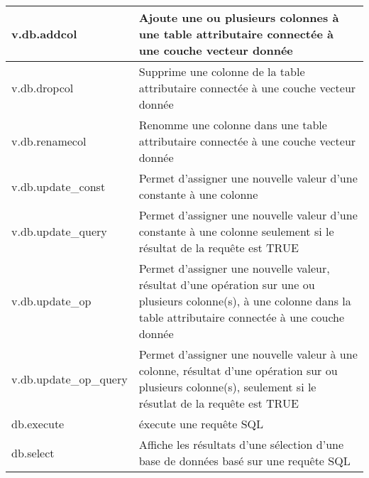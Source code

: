 \begin{table}[H]
\begin{tabular}{|p{4cm}|p{10cm}|}
  \hline v.db.addcol & Ajoute une ou plusieurs colonnes à une table attributaire connectée à une couche vecteur donnée\\
  \hline v.db.dropcol & Supprime une colonne de la table attributaire connectée à une couche vecteur donnée\\
  \hline v.db.renamecol & Renomme une colonne dans une table attributaire connectée à une couche vecteur donnée\\
  \hline v.db.update\_const & Permet d'assigner une nouvelle valeur d'une constante à une colonne\\
  \hline v.db.update\_query & Permet d'assigner une nouvelle valeur d'une constante à une colonne seulement si le résultat de la requ\^ete est TRUE\\
  \hline v.db.update\_op & Permet d'assigner une nouvelle valeur, résultat d'une opération sur une ou plusieurs colonne(s), à une colonne dans la table attributaire connectée à une couche donnée\\
  \hline v.db.update\_op\_query & Permet d'assigner une nouvelle valeur à une colonne, résultat d'une opération sur ou plusieurs colonne(s), seulement si le résutlat de la requ\^ete est TRUE \\
  \hline db.execute & éxecute une requ\^ete SQL\\
  \hline db.select & Affiche les résultats d'une sélection d'une base de données basé sur une requ\^ete SQL\\

\end{tabular}
\end{table}

